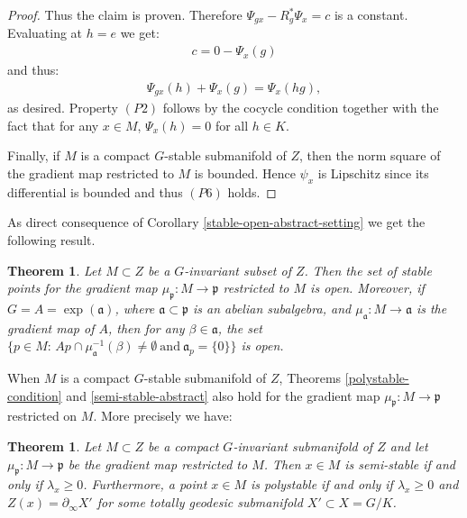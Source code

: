 \documentclass[leqno,11pt, a4]{amsart}
\newtheorem{teo}[equation]{Theorem}
\theoremstyle{named}
\begin{document}
\begin{proof}
  Thus the claim is proven.  Therefore $\Psi_{gx} - R_g^*\Psi_x = c$
  is a constant. Evaluating at $h=e$ we get:
  \begin{gather*}
    c = 0 - \Psi_x(g)
  \end{gather*}
and thus:
  \begin{gather*}
    \Psi_{gx} (h) + \Psi_x(g) = \Psi_x(hg),
  \end{gather*}
  as desired. Property $(P2)$ follows by the cocycle condition together with the fact that for any $x\in M$, $\Psi_x(h)=0$ for all $h\in K$.

Finally, if $M$ is a compact $G$-stable submanifold of $Z$, then the norm square of the gradient map restricted to $M$ is bounded. Hence $\psi_x$ is Lipschitz since its differential is bounded and thus $(P6)$ holds.
\end{proof}
As direct consequence of Corollary \ref{stable-open-abstract-setting} we get the following result.
\begin{teo}
Let $M\subset Z$ be a $G$-invariant subset of $Z$. Then the set of stable points for the gradient map ${\mu_{\mathfrak{p}}}\!:M {\longrightarrow} {\mathfrak{p}}$ restricted to $M$ is open. Moreover, if $G=A=\exp({\mathfrak{a}})$, where ${\mathfrak{a}}\subset {\mathfrak{p}}$ is an abelian subalgebra, and  $\mu_{\mathfrak{a}}:M {\longrightarrow} {\mathfrak{a}}$ is the gradient map of $A$, then for any $\beta \in {\mathfrak{a}}$, the set
$
\{p\in M:\, A p \cap \mu_{\mathfrak{a}}^{-1}(\beta)\neq \emptyset\ \mathrm{and}\ {\mathfrak{a}}_p=\{0\} \}
$
is open.
\end{teo}
When $M$ is a compact $G$-stable submanifold of $Z$, Theorems \ref{polystable-condition} and \ref{semi-stable-abstract} also hold for the gradient map ${\mu_{\mathfrak{p}}}\!:M {\longrightarrow} {\mathfrak{p}}$ restricted on $M$. More precisely we have:

\begin{teo}
Let $M\subset Z$ be a compact $G$-invariant submanifold of $Z$ and let ${\mu_{\mathfrak{p}}}:M {\longrightarrow} {\mathfrak{p}}$ be the gradient map restricted to $M$.
Then $x \in M$ is semi-stable if and only if ${\lambda}_x \geq 0$. Furthermore,  a point $x\in M$ is polystable if and only if ${\lambda}_x \geq 0$ and $Z(x) = \partial_\infty X'$ for some totally geodesic submanifold $X'\subset X=G/K$.
\end{teo}
\end{document}
